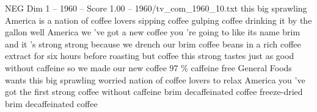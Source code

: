 \begin{textsample}{NEG Dim 1 – 1960 – Score 1.00 – 1960/tv\_com\_1960\_10.txt}  \label{ex:f1_neg_076}
this big sprawling America is a nation of coffee lovers sipping coffee gulping coffee drinking it by the gallon well America we 've got a new coffee you 're going to like its name brim and it 's strong strong because we drench our brim coffee beans in a rich coffee extract for six hours before roasting but coffee this strong tastes just as good without caffeine so we made our new coffee 97 \% caffeine free General Foods wants this big sprawling worried nation of coffee lovers to relax America you 've got the first strong coffee without caffeine brim decaffeinated coffee freeze-dried brim decaffeinated coffee

\end{textsample}
